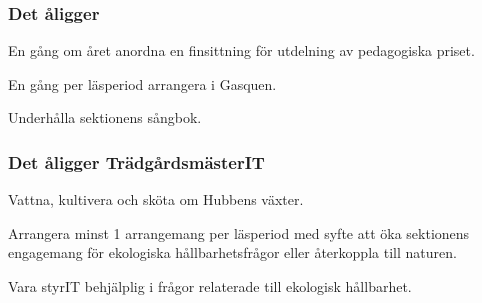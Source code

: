 \subsubsection{Det åligger \SEXIT}
\begin{att}
	\item En gång om året anordna en finsittning för utdelning av pedagogiska priset.
	\item En gång per läsperiod arrangera i Gasquen.
	\item Underhålla sektionens sångbok. 
\end{att}

\subsubsection{Det åligger TrädgårdsmästerIT}
\begin{att}
	\item Vattna, kultivera och sköta om Hubbens växter.
	\item Arrangera minst 1 arrangemang per läsperiod med syfte att öka sektionens engagemang för ekologiska hållbarhetsfrågor eller återkoppla till naturen.
	\item Vara styrIT behjälplig i frågor relaterade till ekologisk hållbarhet.
\end{att}
